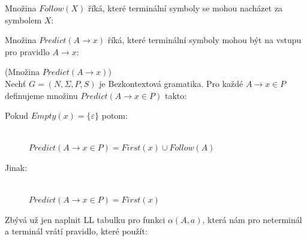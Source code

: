 \noindent
Množina $Follow(X)$ říká, které terminální symboly se mohou nacházet
za symbolem $X$:\\
\begin{algorithm}[H]
  \caption{$Follow(X)$}
  \label{alg:follow}

  \BlankLine
\end{algorithm}
\vspace{0.5cm}

\noindent
Množina $Predict(A \rightarrow x)$ říká, které terminální symboly mohou být
na vstupu pro pravidlo $A \rightarrow x$:
\begin{defn}
  (Množina $Predict(A \rightarrow x)$)\\
  Nechť $G = (N, \Sigma, P, S)$ je Bezkontextová gramatika.
  Pro každé $A \rightarrow x \in P$ definujeme množinu
  $Predict(A \rightarrow x \in P)$ takto:
  \begin{description}
    \item[Pokud $Empty(x) = \{\varepsilon\}$ potom:]\hfill \\
    $Predict(A \rightarrow x \in P) = First(x) \cup Follow(A)$
    \item[Jinak:]\hfill \\
    $Predict(A \rightarrow x \in P) = First(x)$
  \end{description}
\end{defn}
\vspace{0.5cm}

\noindent
Zbývá už jen naplnit LL tabulku pro funkci $\alpha(A, a)$, která nám pro neterminál
a terminál vrátí pravidlo, které použít:\\
\begin{algorithm}[H]
  \caption{$\alpha(A, a)$}

  \BlankLine
\end{algorithm}
\vspace{0.5cm}


